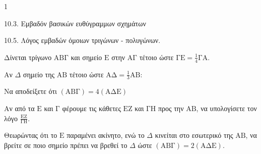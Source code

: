 \begin{ylh}{1}
    \item 10.3. Εμβαδόν βασικών ευθύγραμμων σχημάτων
    \item 10.5. Λόγος εμβαδών όμοιων τριγώνων - πολυγώνων.
\end{ylh}
Δίνεται τρίγωνο $\mathrm{AB\Gamma}$ και σημείο $\mathrm{E}$ στην $\mathrm{A\Gamma}$ τέτοιο ώστε $\mathrm{\Gamma E} = \frac{1}{4} \mathrm{\Gamma A}$.
\begin{alist}
    \item Αν $\Delta$ σημείο της $\mathrm{AB}$ τέτοιο ώστε $\mathrm{A\Delta} = \frac{1}{3} \mathrm{AB}$:
    \begin{rlist}
        \item Να αποδείξετε ότι $(\mathrm{AB\Gamma}) = 4(\mathrm{A\Delta E})$ 
        \item Αν από τα $\mathrm{E}$ και $\mathrm{\Gamma}$ φέρουμε τις κάθετες $\mathrm{EZ}$ και $\mathrm{\Gamma H}$ προς την $\mathrm{AB}$, να υπολογίσετε τον λόγο $\frac{\mathrm{EZ}}{\mathrm{\Gamma H}}$. 
    \end{rlist}
    \item Θεωρώντας ότι το $\mathrm{E}$ παραμένει ακίνητο, ενώ το $\Delta$ κινείται στο εσωτερικό της $\mathrm{AB}$, να βρείτε σε ποιο σημείο πρέπει να βρεθεί το $\Delta$ ώστε $(\mathrm{AB\Gamma}) = 2(\mathrm{A\Delta E})$. 
\end{alist}